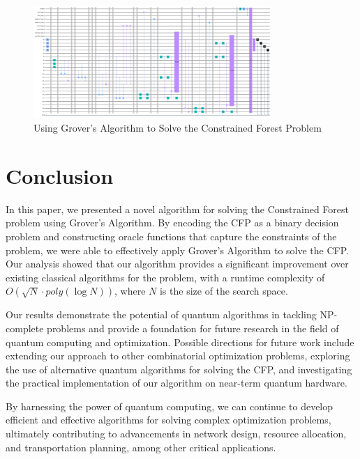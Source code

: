 \begin{figure}[htp]
    \centering
    \includegraphics[width=9cm]{Figures/Constrained_Forest_circuit.png}
    \caption{Using Grover's Algorithm to Solve the Constrained Forest Problem}
    \label{fig:Constrained_Forest}
\end{figure}

\section{Conclusion}
\label{sec:conclusion}

In this paper, we presented a novel algorithm for solving the Constrained Forest problem using Grover's Algorithm. By encoding the CFP as a binary decision problem and constructing oracle functions that capture the constraints of the problem, we were able to effectively apply Grover's Algorithm to solve the CFP. Our analysis showed that our algorithm provides a significant improvement over existing classical algorithms for the problem, with a runtime complexity of $O(\sqrt{N} \cdot poly(\log N))$, where $N$ is the size of the search space.

Our results demonstrate the potential of quantum algorithms in tackling NP-complete problems and provide a foundation for future research in the field of quantum computing and optimization. Possible directions for future work include extending our approach to other combinatorial optimization problems, exploring the use of alternative quantum algorithms for solving the CFP, and investigating the practical implementation of our algorithm on near-term quantum hardware.

By harnessing the power of quantum computing, we can continue to develop efficient and effective algorithms for solving complex optimization problems, ultimately contributing to advancements in network design, resource allocation, and transportation planning, among other critical applications.


